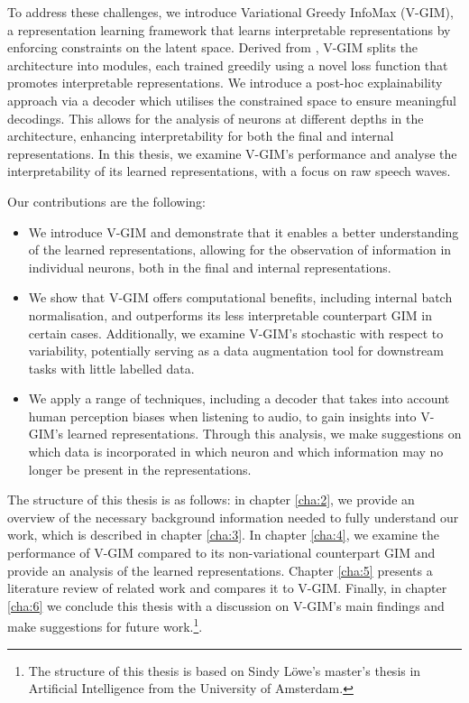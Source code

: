 To address these challenges, we introduce Variational Greedy InfoMax (V-GIM), a representation learning framework that learns interpretable representations by enforcing constraints on the latent space. Derived from \cite{lowePuttingEndEndtoEnd2020a}, V-GIM splits the architecture into modules, each trained greedily using a novel loss function that promotes interpretable representations. We introduce a post-hoc explainability approach via a decoder which utilises the constrained space to ensure meaningful decodings. This allows for the analysis of neurons at different depths in the architecture, enhancing interpretability for both the final and internal representations. In this thesis, we examine V-GIM's performance and analyse the interpretability of its learned representations, with a focus on raw speech waves.


Our contributions are the following:
\begin{itemize}
	\item We introduce V-GIM and demonstrate that it enables a better understanding of the learned representations, allowing for the observation of information in individual neurons, both in the final and internal representations.
	\item We show that V-GIM offers computational benefits, including internal batch normalisation, and outperforms its less interpretable counterpart GIM in certain cases. Additionally, we examine V-GIM's stochastic with respect to variability, potentially serving as a data augmentation tool for downstream tasks with little labelled data.
	\item We apply a range of techniques, including a decoder that takes into account human perception biases when listening to audio, to gain insights into V-GIM's learned representations. Through this analysis, we make suggestions on which data is incorporated in which neuron and which information may no longer be present in the representations.
\end{itemize}


The structure of this thesis is as follows: in chapter \ref{cha:2}, we provide an overview of the necessary background information needed to fully understand our work, which is described in chapter \ref{cha:3}. In chapter \ref{cha:4}, we examine the performance of V-GIM compared to its non-variational counterpart GIM and provide an analysis of the learned representations. Chapter \ref{cha:5} presents a literature review of related work and compares it to V-GIM. Finally, in chapter \ref{cha:6} we conclude this thesis with a discussion on V-GIM's main findings and make suggestions for future work.\footnote{The structure of this thesis is based on Sindy Löwe's master's thesis in Artificial Intelligence from the University of Amsterdam.}. 



